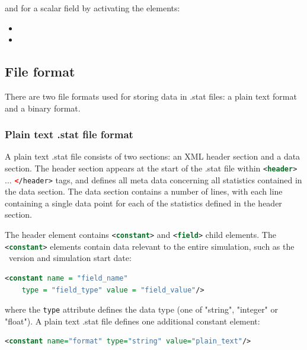 and for a scalar field by activating the elements:

\begin{itemize}
\item {}
\item {}
\end{itemize}

\subsection{File format}

There are two file formats used for storing data in .stat files: a plain text format
and a binary format.

\subsubsection{Plain text .stat file format}

A plain text .stat file consists of two sections: an XML header section and a
data section. The header section appears at the start of the .stat file within
\lstinline[language = XML]*<header>* $\ldots$
\lstinline[language = XML]*</header>* tags, and defines all meta data concerning
all statistics contained in the data section. The data section contains a number of lines,
with each line containing a single data point for each of the statistics defined in the header
section.

The header element contains
\lstinline[language = XML]*<constant>* and
\lstinline[language = XML]*<field>* child elements. The
\lstinline[language = XML]*<constant>* elements contain data relevant to the
entire simulation, such as the \fluidity\ version and simulation start date:

\begin{lstlisting}[language = XML]
  <constant name = "field_name"
    type = "field_type" value = "field_value"/>
\end{lstlisting}

where the \lstinline[language = XML]*type* attribute defines the data type
(one of "string", "integer" or "float"). A plain text .stat file defines one
additional constant element:

\begin{lstlisting}[language = XML]
<constant name="format" type="string" value="plain_text"/>
\end{lstlisting}


